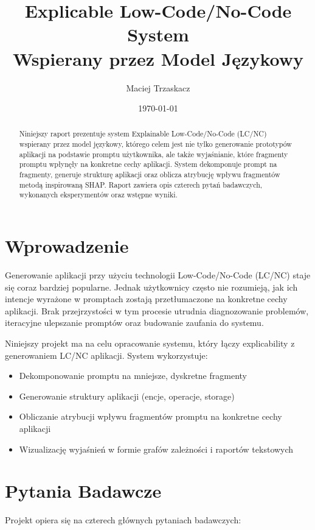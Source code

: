 \documentclass[12pt,a4paper]{article}
\title{Explicable Low-Code/No-Code System\\Wspierany przez Model Językowy}
\author{Maciej Trzaskacz}
\date{\today}
\begin{document}
\maketitle

\begin{abstract}
Niniejszy raport prezentuje system Explainable Low-Code/No-Code (LC/NC) wspierany przez model językowy, którego celem jest nie tylko generowanie prototypów aplikacji na podstawie promptu użytkownika, ale także wyjaśnianie, które fragmenty promptu wpłynęły na konkretne cechy aplikacji. System dekomponuje prompt na fragmenty, generuje strukturę aplikacji oraz oblicza atrybucję wpływu fragmentów metodą inspirowaną SHAP. Raport zawiera opis czterech pytań badawczych, wykonanych eksperymentów oraz wstępne wyniki.
\end{abstract}

\section{Wprowadzenie}

Generowanie aplikacji przy użyciu technologii Low-Code/No-Code (LC/NC) staje się coraz bardziej popularne. Jednak użytkownicy często nie rozumieją, jak ich intencje wyrażone w promptach zostają przetłumaczone na konkretne cechy aplikacji. Brak przejrzystości w tym procesie utrudnia diagnozowanie problemów, iteracyjne ulepszanie promptów oraz budowanie zaufania do systemu.

Niniejszy projekt ma na celu opracowanie systemu, który łączy explicability z generowaniem LC/NC aplikacji. System wykorzystuje:
\begin{itemize}
    \item Dekomponowanie promptu na mniejsze, dyskretne fragmenty
    \item Generowanie struktury aplikacji (encje, operacje, storage)
    \item Obliczanie atrybucji wpływu fragmentów promptu na konkretne cechy aplikacji
    \item Wizualizację wyjaśnień w formie grafów zależności i raportów tekstowych
\end{itemize}

\section{Pytania Badawcze}

Projekt opiera się na czterech głównych pytaniach badawczych:
\end{document}
